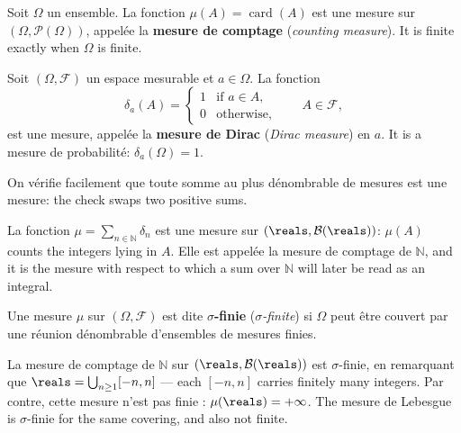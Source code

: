 \begin{example}
  Soit $\Omega$ un ensemble. La fonction $\mu(A) = \operatorname{card}(A)$ est une
  mesure sur $(\Omega,\mathcal{P}(\Omega))$, appelée la \textbf{mesure de comptage}
  (\textit{counting measure}). It is finite exactly when $\Omega$ is finite.
\end{example}

\begin{example}
  Soit $(\Omega,\mathcal{F})$ un espace mesurable et $a \in \Omega$. La fonction
  \[
    \delta_{a}(A) =
    \begin{cases}
      1 & \text{if } a \in A,\\
      0 & \text{otherwise,}
    \end{cases}
    \qquad A \in \mathcal{F},
  \]
  est une mesure, appelée la \textbf{mesure de Dirac} (\textit{Dirac measure}) en
  $a$. It is a mesure de probabilité: $\delta_{a}(\Omega) = 1$.
\end{example}

On vérifie facilement que toute somme au plus dénombrable de mesures est une
mesure: the check swaps two positive sums.

\begin{example}
  La fonction $\mu = \sum_{n \in \mathbb{N}} \delta_{n}$ est une mesure sur
  $(\reals,\mathcal{B}(\reals))$: $\mu(A)$ counts the integers lying in $A$. Elle est
  appelée la mesure de comptage de $\mathbb{N}$, and it is the mesure with respect
  to which a sum over $\mathbb{N}$ will later be read as an integral.
\end{example}

\begin{definition}
  Une mesure $\mu$ sur $(\Omega,\mathcal{F})$ est dite \textbf{$\sigma$-finie}
  (\textit{$\sigma$-finite}) si $\Omega$ peut être couvert par une réunion
  dénombrable d'ensembles de mesures finies.
\end{definition}

\begin{example}
  La mesure de comptage de $\mathbb{N}$ sur $(\reals,\mathcal{B}(\reals))$ est
  $\sigma$-finie, en remarquant que $\reals = \bigcup_{n \geq 1} [-n,n]$ --- each
  $[-n,n]$ carries finitely many integers. Par contre, cette mesure n'est pas finie :
  $\mu(\reals) = +\infty$. The mesure de Lebesgue is $\sigma$-finie for the same
  covering, and also not finite.
\end{example}

